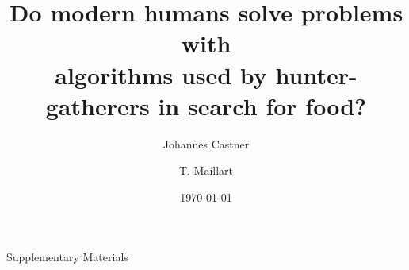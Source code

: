 \documentclass[12pt]{revtex4}
\begin{document}
\title{Do modern humans solve problems with \\ algorithms used by hunter-gatherers in search for food?}

\author{Johannes Castner}

\author{T. Maillart}



\date{\today}


\begin{abstract}

\end{abstract}

\maketitle



%








\clearpage


\clearpage
%

\renewcommand\thesection{S\arabic{section}}
\setcounter{section}{0}

\begin{center}
{\Large Supplementary Materials}
\vspace{3cm}
\end{center}


\end{document}
